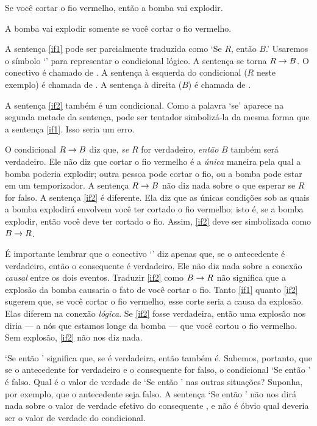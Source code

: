 \begin{earg}
\item[\ex{if1}] Se você cortar o fio vermelho, então a bomba vai explodir.
\item[\ex{if2}] A bomba vai explodir somente se você cortar o fio vermelho.
\end{earg}

A sentença \ref{if1} pode ser parcialmente traduzida como `Se $R$, então $B$.' Usaremos o símbolo `\eif' para representar o condicional lógico. A sentença se torna $R\rightarrow B$. O conectivo é chamado de . A sentença à esquerda do condicional ($R$ neste exemplo) é chamada de . A sentença à direita ($B$) é chamada de .

A sentença \ref{if2} também é um condicional. Como a palavra `se' aparece na segunda metade da sentença, pode ser tentador simbolizá-la da mesma forma que a sentença \ref{if1}. Isso seria um erro.

O condicional $R\rightarrow B$ diz que, \emph{se} $R$ for verdadeiro, \emph{então} $B$ também será verdadeiro. Ele não diz que cortar o fio vermelho é a \emph{única} maneira pela qual a bomba poderia explodir; outra pessoa pode cortar o fio, ou a bomba pode estar em um temporizador. A sentença $R\rightarrow B$ não diz nada sobre o que esperar se $R$ for falso. A sentença \ref{if2} é diferente. Ela diz que as únicas condições sob as quais a bomba explodirá envolvem você ter cortado o fio vermelho; isto é, se a bomba explodir, então você deve ter cortado o fio. Assim, \ref{if2} deve ser simbolizada como $B \rightarrow R$.

É importante lembrar que o conectivo `\eif' diz apenas que, se o antecedente é verdadeiro, então o consequente é verdadeiro. Ele não diz nada sobre a conexão \emph{causal} entre os dois eventos. Traduzir \ref{if2} como $B \rightarrow R$ não significa que a explosão da bomba causaria o fato de você cortar o fio. Tanto \ref{if1} quanto \ref{if2} sugerem que, se você cortar o fio vermelho, esse corte seria a causa da explosão. Elas diferem na conexão \emph{lógica}. Se \ref{if2} fosse verdadeira, então uma explosão nos diria — a nós que estamos longe da bomba — que você cortou o fio vermelho. Sem explosão, \ref{if2} não nos diz nada.


`Se  então ' significa que, se  é verdadeira, então  também é. Sabemos, portanto, que se o antecedente  for verdadeiro e o consequente  for falso, o condicional `Se  então ' é falso. Qual é o valor de verdade de `Se  então ' nas outras situações? Suponha, por exemplo, que o antecedente  seja falso. A sentença `Se  então ' não nos dirá nada sobre o valor de verdade efetivo do consequente , e não é óbvio qual deveria ser o valor de verdade do condicional.

